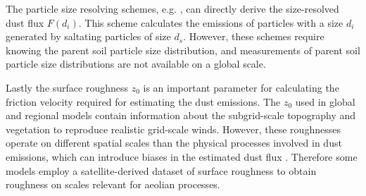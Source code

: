 
The particle size resolving schemes, e.g. \textcite{shao2004simplification}, can directly derive the size-resolved dust flux $F(d_i)$. This scheme calculates the emissions of particles with a size $d_i$ generated by saltating particles of size $d_s$. However, these schemes require knowing the parent soil particle size distribution, and measurements of parent soil particle size distributions are not available on a global scale.

Lastly the surface roughness $z_0$ is an important parameter for calculating the friction velocity required for estimating the dust emissions. The $z_0$ used in global and regional models contain information about the subgrid-scale topography and vegetation to reproduce realistic grid-scale winds. However, these roughnesses operate on different spatial scales than the physical processes involved in dust emissions, which can introduce biases in the estimated dust flux \parencite{darmenova_development_2009}. Therefore some models employ a satellite-derived dataset of surface roughness to obtain roughness on scales relevant for aeolian processes. 


